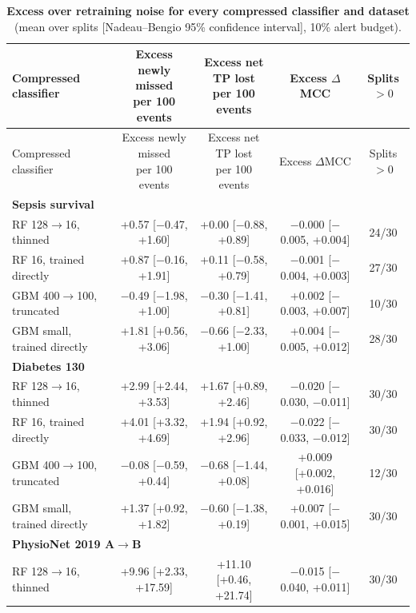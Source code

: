 {\scriptsize
\begin{longtable}{lcccc}
\caption{\textbf{Excess over retraining noise for every compressed classifier and dataset} (mean over splits [Nadeau--Bengio 95\% confidence interval], 10\% alert budget).}\label{tab:ALL-VARIANTS}\\
\toprule
Compressed classifier & \shortstack{Excess newly missed\\per 100 events} & \shortstack{Excess net TP lost\\per 100 events} & Excess $\Delta$MCC & Splits $>0$ \\
\midrule
\endfirsthead
\toprule
Compressed classifier & \shortstack{Excess newly missed\\per 100 events} & \shortstack{Excess net TP lost\\per 100 events} & Excess $\Delta$MCC & Splits $>0$ \\
\midrule
\endhead
\multicolumn{5}{l}{\textbf{Sepsis survival}} \\*
\quad RF 128$\rightarrow$16, thinned & +0.57 [$-$0.47, +1.60] & +0.00 [$-$0.88, +0.89] & $-$0.000 [$-$0.005, +0.004] & 24/30 \\
\quad RF 16, trained directly & +0.87 [$-$0.16, +1.91] & +0.11 [$-$0.58, +0.79] & $-$0.001 [$-$0.004, +0.003] & 27/30 \\
\quad GBM 400$\rightarrow$100, truncated & $-$0.49 [$-$1.98, +1.00] & $-$0.30 [$-$1.41, +0.81] & +0.002 [$-$0.003, +0.007] & 10/30 \\
\quad GBM small, trained directly & +1.81 [+0.56, +3.06] & $-$0.66 [$-$2.33, +1.00] & +0.004 [$-$0.005, +0.012] & 28/30 \\
\midrule
\multicolumn{5}{l}{\textbf{Diabetes 130}} \\*
\quad RF 128$\rightarrow$16, thinned & +2.99 [+2.44, +3.53] & +1.67 [+0.89, +2.46] & $-$0.020 [$-$0.030, $-$0.011] & 30/30 \\
\quad RF 16, trained directly & +4.01 [+3.32, +4.69] & +1.94 [+0.92, +2.96] & $-$0.022 [$-$0.033, $-$0.012] & 30/30 \\
\quad GBM 400$\rightarrow$100, truncated & $-$0.08 [$-$0.59, +0.44] & $-$0.68 [$-$1.44, +0.08] & +0.009 [+0.002, +0.016] & 12/30 \\
\quad GBM small, trained directly & +1.37 [+0.92, +1.82] & $-$0.60 [$-$1.38, +0.19] & +0.007 [$-$0.001, +0.015] & 30/30 \\
\midrule
\multicolumn{5}{l}{\textbf{PhysioNet 2019 A$\rightarrow$B}} \\*
\quad RF 128$\rightarrow$16, thinned & +9.96 [+2.33, +17.59] & +11.10 [+0.46, +21.74] & $-$0.015 [$-$0.040, +0.011] & 30/30 \\

\end{longtable}}
